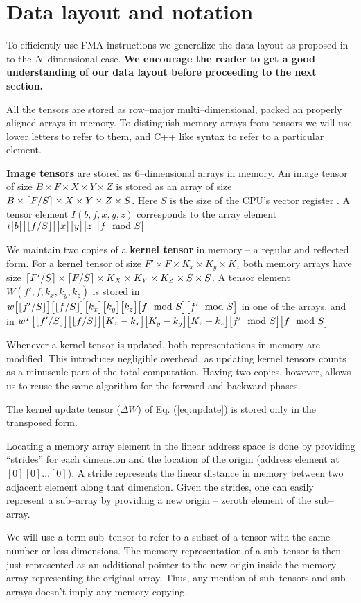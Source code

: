 \section{Data layout and notation}

  To efficiently use FMA instructions we generalize the data layout as
  proposed in~\cite{jeffers2016knl, cpu-myth} to the $N$--dimensional
  case.  {\bf We encourage the reader to get a good understanding of
    our data layout before proceeding to the next section.}

  All the tensors are stored as row--major multi--dimensional, packed
  an properly aligned arrays in memory.  To distinguish memory arrays
  from tensors we will use lower letters to refer to them, and C++
  like syntax to refer to a particular element.

  {\bf Image tensors} are stored as 6--dimensional
  arrays in memory.  An image tensor of size $B \times F \times X
  \times Y \times Z$ is stored as an array of size $B \times
  \lceil F/S\rceil \times X \times Y \times Z \times S$.  Here $S$ is the
  size of the CPU's vector register .  A tensor element
  $I(b,f,x,y,z)$ corresponds to the array element
  $i\big[b\big]\big[\lfloor f/S\rfloor\big]\big[x\big]\big[y\big]\big[z\big]\big[f\mod S\big]$

  We maintain two copies of a {\bf kernel tensor} in memory -- a
  regular and reflected form.  For a kernel tensor of size $F' \times
  F \times K_x \times K_y \times K_z$ both memory arrays have size
  $\lceil F'/S\rceil \times \lceil F/S\rceil \times K_X \times K_Y \times K_Z
  \times S \times S$.  A tensor element $W(f',f,k_x,k_y,k_z)$ is
  stored in $w\big[\lfloor f'/S\rfloor\big]
  \big[\lfloor f/S\rfloor\big]\big[k_x\big]\big[k_y\big]\big[k_z\big]\big[f\mod S\big]\big[f'
    \mod S\big]$ in one of the arrays, and in $w^T\big[\lfloor f'/S\rfloor\big]
  \big[\lfloor f/S\rfloor\big]\big[K_x-k_x\big]\big[K_y-k_y\big]\big[K_z-k_z\big]\big[f'\mod
    S\big]\big[f\mod S\big]$

  Whenever a kernel tensor is updated, both representations in
  memory are modified.  This introduces negligible overhead, as
  updating kernel tensors counts as a minuscule part of the total
  computation.  Having two copies, however, allows us to reuse the
  same algorithm for the forward and backward phases.

  The kernel update tensor ($\Delta W$) of Eq. (\ref{eq:update}) is
  stored only in the transposed form.

  Locating a memory array element in the linear address space is done
  by providing ``strides'' for each dimension and the location of the
  origin (address element at $[0][0]\dots[0]$).  A stride represents
  the linear distance in memory between two adjacent element along
  that dimension.  Given the strides, one can easily represent a
  sub--array by providing a new origin -- zeroth element of the
  sub--array.

  We will use a term sub--tensor to refer to a subset of a tensor with
  the same number or less dimensions.  The memory representation of a
  sub--tensor is then just represented as an additional pointer to the
  new origin inside the memory array representing the original array.
  Thus, any mention of sub--tensors and sub--arrays doesn't imply any
  memory copying.
